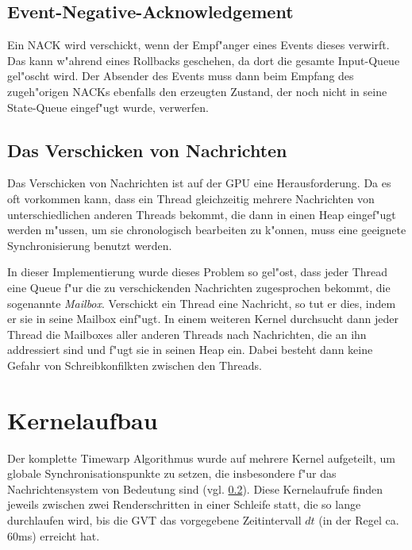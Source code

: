 \documentclass[a4paper, 10pt, openright, parskip, chapterprefix]{scrreprt}
\begin{document}
\subsection{Event-Negative-Acknowledgement}
Ein NACK wird verschickt, wenn der Empf"anger eines Events dieses verwirft. Das kann w"ahrend eines Rollbacks geschehen,
da dort die gesamte Input-Queue gel"oscht wird. Der Absender des Events muss dann beim Empfang des zugeh"origen NACKs
ebenfalls den erzeugten Zustand, der noch nicht in seine State-Queue eingef"ugt wurde, verwerfen.

\subsection{Das Verschicken von Nachrichten}
\label{subsec:VerschickenVonNachrichten}
Das Verschicken von Nachrichten ist auf der GPU eine Herausforderung. Da es oft vorkommen kann, dass ein Thread
gleichzeitig mehrere Nachrichten von unterschiedlichen anderen Threads bekommt, die dann in einen Heap eingef"ugt werden
m"ussen, um sie chronologisch bearbeiten zu k"onnen, muss eine geeignete Synchronisierung
benutzt werden. 

In dieser Implementierung wurde dieses Problem so gel"ost, dass jeder Thread eine Queue f"ur die zu verschickenden
Nachrichten zugesprochen bekommt, die sogenannte \emph{Mailbox}. Verschickt ein Thread eine Nachricht, so tut er dies,
indem er sie in seine Mailbox einf"ugt.
In einem weiteren
Kernel durchsucht dann jeder Thread die Mailboxes aller anderen Threads nach Nachrichten, die an ihn addressiert sind
und f"ugt sie in seinen Heap ein. Dabei besteht dann keine Gefahr von Schreibkonfilkten zwischen den Threads.


\section{Kernelaufbau}
\label{sec:Kernelaufbau}
Der komplette Timewarp Algorithmus wurde auf mehrere Kernel aufgeteilt, um globale Synchronisationspunkte zu setzen, die
insbesondere f"ur das Nachrichtensystem von Bedeutung sind (vgl. \ref{subsec:VerschickenVonNachrichten}).
Diese Kernelaufrufe finden jeweils zwischen zwei Renderschritten in einer Schleife statt, die so lange durchlaufen wird,
bis die GVT das vorgegebene Zeitintervall $dt$ (in der Regel ca. 60ms) erreicht hat.
\end{document}
